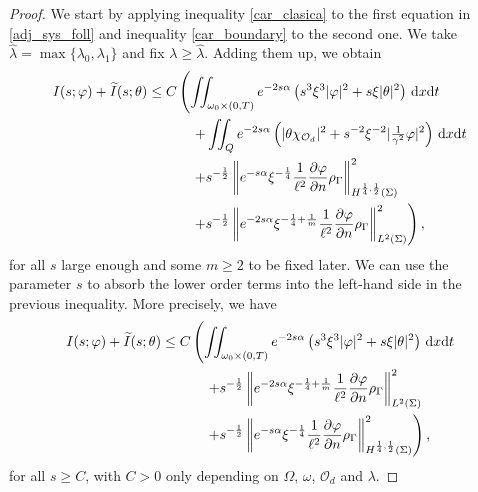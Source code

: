 \documentclass{aims}
\theoremstyle{definition}
\def\csbd{\rho_{\Gamma}}
\def\dx{\,\textnormal{d}x}
\def\dt{\textnormal{d}t}
\begin{document}
\begin{proof}
We start by applying inequality \eqref{car_clasica} to the first equation in \eqref{adj_sys_foll} and inequality \eqref{car_boundary} to the second one. We take $\hat \lambda=\max\{\lambda_0,\lambda_1\}$ and fix $\lambda\geq \hat \lambda$. Adding them up, we obtain
%
\begin{equation*}
\begin{split}
I(s;\varphi)+\widetilde{I}(s;\theta)\leq C&\left(\iint_{\omega_0\times(0,T)}e^{-2s\alpha}\left(s^3\xi^3|\varphi|^2+s\xi|\theta|^2\right)\dx\dt \right. \\
&\quad \left. +\iint_Q e^{-2s\alpha}\left(|\theta\chi_{\mathcal O_d}|^2+s^{-2}\xi^{-2}|\tfrac{1}{\gamma^2}\varphi|^2\right)\dx\dt\right. \\
&\quad\left. +s^{-\frac{1}{2}}\left\|e^{-s\alpha}\xi^{-\frac{1}{4}}\frac{1}{\ell^2}\frac{\partial \varphi}{\partial n}\csbd \right\|^2_{H^{\frac{1}{4},\frac{1}{2}}(\Sigma)}\right. \\
&\quad \left. +s^{-\frac{1}{2}}\left\| e^{-2s\alpha}\xi^{-\frac{1}{4}+\frac{1}{m}} \frac{1}{\ell^2}\frac{\partial \varphi}{\partial n} \csbd \right\|^{2}_{L^2(\Sigma)}  \right),
\end{split}
\end{equation*}
%
for all $s$ large enough and some $m\geq 2$ to be fixed later. We can use the parameter $s$ to absorb the lower order terms into the left-hand side in the previous inequality. More precisely, we have 
%
\begin{equation}\label{car_con_bound}
\begin{split}
I(s;\varphi)+\widetilde{I}(s;\theta)\leq C&\left(\iint_{\omega_0\times(0,T)}e^{-2s\alpha}\left(s^3\xi^3|\varphi|^2+s\xi|\theta|^2\right)\dx\dt \right. \\
&\quad\left.+ s^{-\frac{1}{2}}\left\| e^{-2s\alpha}\xi^{-\frac{1}{4}+\frac{1}{m}} \frac{1}{\ell^2}\frac{\partial \varphi}{\partial n} \csbd \right\|^{2}_{L^2(\Sigma)} \right. \\
&\quad\left. +s^{-\frac{1}{2}}\left\|e^{-s\alpha}\xi^{-\frac{1}{4}}\frac{1}{\ell^2}\frac{\partial \varphi}{\partial n}\csbd \right\|^2_{H^{\frac{1}{4},\frac{1}{2}}(\Sigma)}  \right),
\end{split}
\end{equation}
%
for all $s\geq C$, with $C>0$ only depending on $\Omega$, $\omega$, $\mathcal O_d$ and $\lambda$. 


\end{proof}
\end{document}
